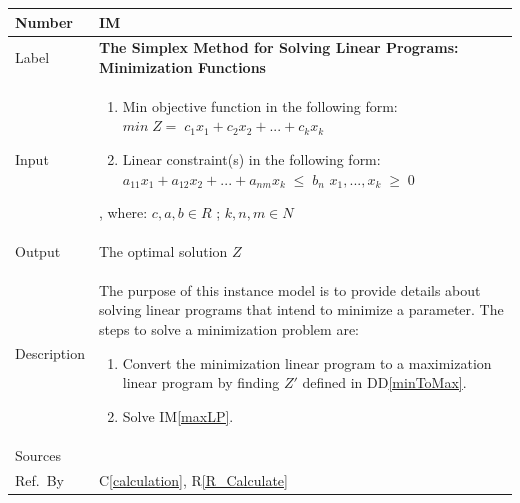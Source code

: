\documentclass[12pt]{article}
\newcommand{\colAwidth}{0.13\textwidth}
\newcommand{\colBwidth}{0.82\textwidth}
\newcommand{\ddref}[1]{DD\ref{#1}}
\newcommand{\calcref}[1]{C\ref{#1}}
\newcounter{instnum} %
\newcommand{\iref}[1]{IM\ref{#1}}
\newcommand{\rref}[1]{R\ref{#1}}
\begin{document}
\noindent
\begin{minipage}{\textwidth}
	\renewcommand*{\arraystretch}{1.5}
	\begin{tabular}{| p{\colAwidth} | p{\colBwidth}|}
		\hline
		\rowcolor[gray]{0.9}
		Number& IM{instnum}\theinstnum \label{minLP}\\
		\hline
		Label& \bf The Simplex Method for Solving Linear Programs: Minimization 
		Functions\\
		\hline
		Input& 
		\begin{enumerate}
			\item Min objective function in the following form: 
			\newline$min\;Z=\;c_{1}x_1 + c_{2}x_2 + ... + c_{k}x_k$
			
			\item Linear constraint(s) in the following form: 
			\newline$a_{11}x_1 + a_{12}x_2 + ... + a_{nm}x_k\;{\leq}\;b_n$
			\newline$x_1, ..., x_k\;{\geq}\;0$
		\end{enumerate} , where: $c, a, b \in R$ ; $k, n, m \in N$\\
		\hline
		Output& The optimal solution $Z$\\
		\hline
		Description& The purpose of this instance model is to provide details 
		about solving linear programs that intend to minimize a parameter. The 
		steps to solve a minimization problem are:
		\begin{enumerate}
			\item Convert the minimization linear program to a maximization 
			linear program by finding $Z'$ defined in \ddref{minToMax}.
			
			\item Solve \iref{maxLP}.
		\end{enumerate}
		\\
		\hline
		Sources& \cite{lp-defs}\\
		\hline
		Ref.\ By & \calcref{calculation}, \rref{R_Calculate} \\
		\hline
	\end{tabular}
\end{minipage}\\

\end{document}
